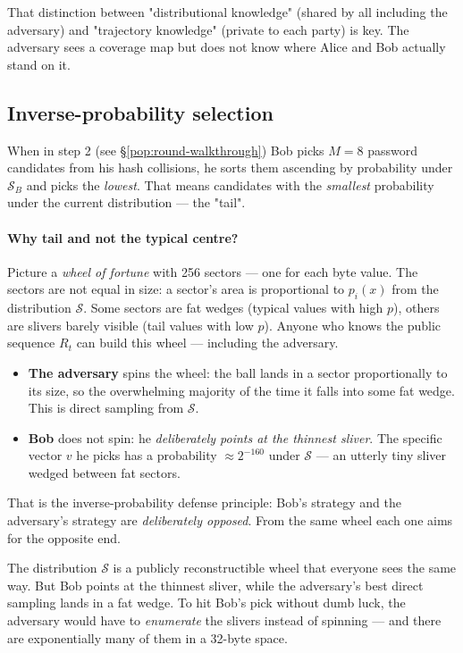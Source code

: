 \documentclass[11pt,a4paper]{article}
\begin{document}
That distinction between "distributional knowledge" (shared by all including the adversary) and "trajectory knowledge" (private to each party) is key. The adversary sees a coverage map but does not know where Alice and Bob actually stand on it.

\subsection{Inverse-probability selection}

When in step 2 (see §\ref{pop:round-walkthrough}) Bob picks $M = 8$ password candidates from his hash collisions, he sorts them ascending by probability under $\mathcal{S}_B$ and picks the \emph{lowest}. That means candidates with the \emph{smallest} probability under the current distribution --- the "tail".

\paragraph{Why tail and not the typical centre?} Picture a \emph{wheel of fortune} with 256 sectors --- one for each byte value. The sectors are not equal in size: a sector's area is proportional to $p_i(x)$ from the distribution $\mathcal{S}$. Some sectors are fat wedges (typical values with high $p$), others are slivers barely visible (tail values with low $p$). Anyone who knows the public sequence $R_t$ can build this wheel --- including the adversary.

\begin{itemize}[leftmargin=*]
\item \textbf{The adversary} spins the wheel: the ball lands in a sector proportionally to its size, so the overwhelming majority of the time it falls into some fat wedge. This is direct sampling from $\mathcal{S}$.
\item \textbf{Bob} does not spin: he \emph{deliberately points at the thinnest sliver}. The specific vector $v$ he picks has a probability $\approx 2^{-160}$ under $\mathcal{S}$ --- an utterly tiny sliver wedged between fat sectors.
\end{itemize}

That is the inverse-probability defense principle: Bob's strategy and the adversary's strategy are \emph{deliberately opposed}. From the same wheel each one aims for the opposite end.

\begin{aha}
The distribution $\mathcal{S}$ is a publicly reconstructible wheel that everyone sees the same way. But Bob points at the thinnest sliver, while the adversary's best direct sampling lands in a fat wedge. To hit Bob's pick without dumb luck, the adversary would have to \emph{enumerate} the slivers instead of spinning --- and there are exponentially many of them in a 32-byte space.
\end{aha}
\end{document}
